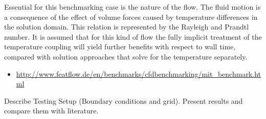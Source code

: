Essential for this benchmarking case is the nature of the flow. The fluid motion is a consequence of the effect of volume forces caused by temperature differences in the solution domain. This relation is represented by the Rayleigh and Prandtl number. It is assumed that for this kind of flow the fully implicit treatment of the temperature coupling will yield further benefits with respect to wall time, compared with solution approaches that solve for the temperature separately.

      \begin{itemize}
      \item \url{http://www.featflow.de/en/benchmarks/cfdbenchmarking/mit_benchmark.html}
      \end{itemize}
      Describe Testing Setup (Boundary conditions and grid). Present results and compare them with literature.
